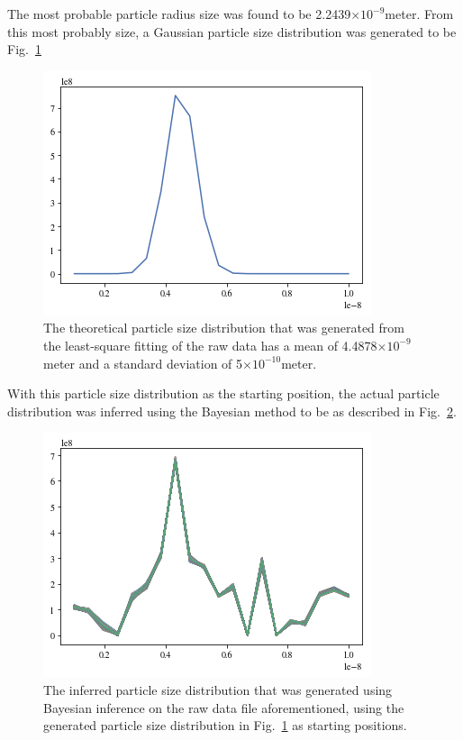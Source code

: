 \documentclass[11pt]{article}
\begin{document}
The most probable particle radius size was found to be 2.2439$\times10^{-9}$\si{meter}. From this most probably size, a Gaussian particle size distribution was generated to be Fig.~\ref{fig:f}

\begin{figure}[h!]
\centering
\includegraphics[width=0.5\linewidth]{theory_f(D)_06242019.png}
\caption{The theoretical particle size distribution that was generated from the least-square fitting of the raw data has a mean of 4.4878$\times10^{-9}$\si{meter} and a standard deviation of 5$\times10^{-10}$\si{meter}.}
\label{fig:f}
\end{figure}

With this particle size distribution as the starting position, the actual particle distribution was inferred using the Bayesian method to be as described in Fig.~\ref{fig:actual_distribution1}.

\begin{figure}[h!]
\centering
\includegraphics[width=0.5\linewidth]{f(D)_06242019.png}
\caption{The inferred particle size distribution that was generated using Bayesian inference on the raw data file aforementioned, using the generated particle size distribution in Fig.~\ref{fig:f} as starting positions.}
\label{fig:actual_distribution1}
\end{figure}
\end{document}
